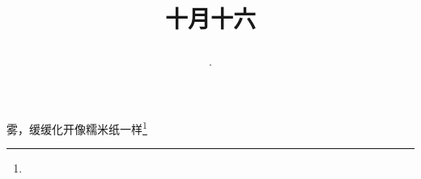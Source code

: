 \title{\date[d=16,m=11,y=2024][year:cn-y,年,month:cn,day:cn,日,·,weekday]·十月十六 }
雾，缓缓化开像糯米纸一样\footnote{ }

